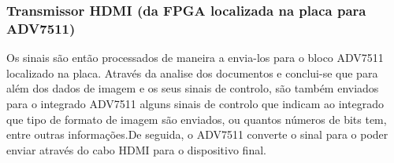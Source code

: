 %	
	

	
\subsubsection{Transmissor HDMI (da FPGA localizada na placa para ADV7511)}

Os sinais são então processados de maneira a envia-los para o bloco ADV7511 localizado na placa. Através da analise dos documentos \cite{R017} e \cite{R018} conclui-se que para além dos dados de imagem e os seus sinais de controlo, são também enviados para o integrado ADV7511 alguns sinais de controlo que indicam ao integrado que tipo de formato de imagem são enviados, ou quantos números de bits tem, entre outras informações.De seguida, o ADV7511 converte o sinal para o poder enviar através do cabo HDMI para o dispositivo final. 



